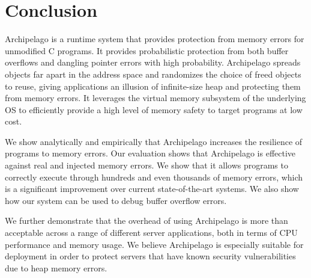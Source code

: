 \documentclass{acm_proc_article-sp}
\begin{document}


\section{Conclusion}


\noindent
\label{sec:fin}
Archipelago is a runtime system that provides protection from memory
errors for unmodified C programs. It provides probabilistic protection
from both buffer overflows and dangling pointer errors with high
probability. Archipelago spreads objects far apart in the address space
and randomizes the choice of freed objects to reuse, giving
applications an illusion of infinite-size heap and protecting them
from memory errors. It leverages the virtual memory subsystem of the
underlying OS to efficiently provide a high level of memory safety to
target programs at low cost.

We show analytically and empirically that Archipelago increases the
resilience of programs to memory errors. Our
evaluation shows that Archipelago is effective against real
and injected memory errors. We show that it allows programs to
correctly execute through hundreds and even thousands of memory
errors, which is a significant improvement over current
state-of-the-art systems. We also show how our system can be used to
debug buffer overflow errors.

We further demonstrate that the overhead of using Archipelago is more
than acceptable across a range of different server applications, both
in terms of CPU performance and memory usage. We believe Archipelago
is especially suitable for deployment in order to protect servers that
have known security vulnerabilities due to heap memory errors.


\newpage





\balancecolumns
\end{document}
